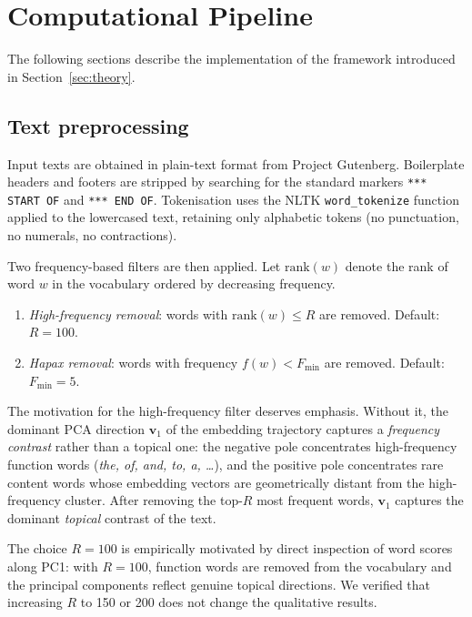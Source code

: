 \documentclass[12pt,a4paper]{article}
\begin{document}
\section{Computational Pipeline}
\label{sec:pipeline}

The following sections describe the implementation of the framework
introduced in Section~\ref{sec:theory}.

\subsection{Text preprocessing}
\label{sec:preprocessing}
\label{sec:filtering_results}

Input texts are obtained in plain-text format from Project Gutenberg.
Boilerplate headers and footers are stripped by searching for the
standard markers \texttt{*** START OF} and \texttt{*** END OF}.
Tokenisation uses the NLTK \texttt{word\_tokenize} function applied to
the lowercased text, retaining only alphabetic tokens (no punctuation,
no numerals, no contractions).

Two frequency-based filters are then applied.
Let $\mathrm{rank}(w)$ denote the rank of word $w$ in the vocabulary
ordered by decreasing frequency.
\begin{enumerate}
  \item \emph{High-frequency removal}: words with
        $\mathrm{rank}(w) \leq R$ are removed.
        Default: $R = 100$.
  \item \emph{Hapax removal}: words with frequency $f(w) < F_{\min}$
        are removed.
        Default: $F_{\min} = 5$.
\end{enumerate}
The motivation for the high-frequency filter deserves emphasis.
Without it, the dominant PCA direction $\mathbf{v}_1$ of the embedding
trajectory captures a \emph{frequency contrast} rather than a topical
one: the negative pole concentrates high-frequency function words
(\emph{the, of, and, to, a, \ldots}), and the positive pole concentrates
rare content words whose embedding vectors are geometrically distant
from the high-frequency cluster.
After removing the top-$R$ most frequent words, $\mathbf{v}_1$
captures the dominant \emph{topical} contrast of the text.

The choice $R = 100$ is empirically motivated by direct inspection of
word scores along PC1: with $R = 100$, function words are removed
from the vocabulary and the principal components reflect genuine
topical directions.
We verified that increasing $R$ to 150 or 200 does not change the
qualitative results.
\end{document}
